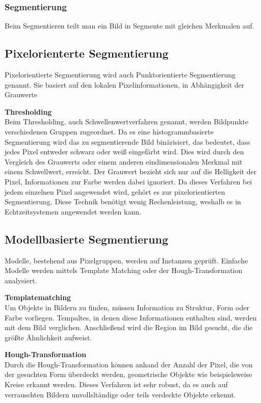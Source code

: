     \subsubsection{Segmentierung}
    Beim Segmentieren teilt man ein Bild in Segmente mit gleichen Merkmalen auf.

    \subsection*{Pixelorienterte Segmentierung}
    Pixelorientierte Segmentierung\cite{Seg_punkt} wird auch Punktorientierte Segmentierung genannt. Sie basiert auf den lokalen Pixelinformationen, in Abhängigkeit der Grauwerte 

    \textbf{Thresholding}\\
    Beim Thresholding, auch Schwellenwertverfahren genannt, werden Bildpunkte verschiedenen Gruppen zugeordnet. Da es eine histogrammbasierte Segmentierung wird das zu segmentierende Bild binärisiert, das bedeutet, dass jedes Pixel entweder schwarz oder weiß eingefärbt wird. Dies wird durch den Vergleich des Grauwerts oder einem anderen eindimensionalen Merkmal mit einem Schwellwert, erreicht. Der Grauwert bezieht sich nur auf die Helligkeit der Pixel, Informationen zur Farbe werden dabei ignoriert. Da dieses Verfahren bei jedem einzelnen Pixel angewendet wird, gehört es zur pixelorientierten Segmentierung. Diese Technik benötigt wenig Rechenleistung, weshalb es in Echtzeitsystemen angewendet werden kann.

    \subsection*{Modellbasierte Segmentierung}
    Modelle, bestehend aus Pixelgruppen, werden auf Instanzen geprüft. Einfache Modelle werden mittels Template Matching oder der Hough-Transformation analysiert. 

    \textbf{Templatematching}\\
    Um Objekte in Bildern zu finden, müssen Information zu Struktur, Form oder Farbe vorliegen. Tempaltes,\cite{Seg_modell} in denen diese Informationen enthalten sind, werden mit dem Bild verglichen. Anschließend wird die Region im Bild gesucht, die die größte Ähnlichkeit aufweist.

    \textbf{Hough-Transformation}\\
    Durch die Hough-Transformation\cite{Seg_modell} können anhand der Anzahl der Pixel, die von der gesuchten Form überdeckt werden, geometrische Objekte wie beispielsweise Kreise erkannt werden. Dieses Verfahren ist sehr robust, da es auch auf verrauschten Bildern unvollsltändige oder teils verdeckte Objekte erkennt.


